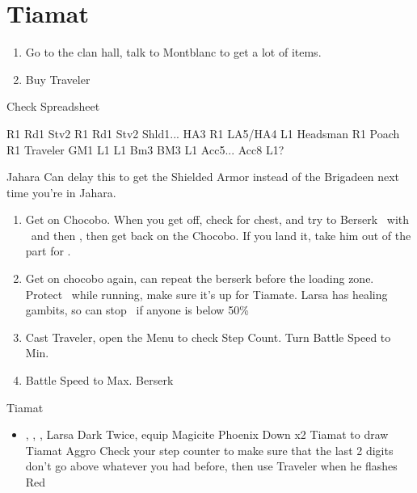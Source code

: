 \chapter{Tiamat}

\begin{enumerate}
\item Go to the clan hall, talk to Montblanc to get a lot of items.
\item Buy Traveler
\end{enumerate}
\begin{liscense}
Check Spreadsheet

			R1	Rd1	
				Stv2	
				R1	Rd1
					Stv2
Shld1... HA3					R1
LA5/HA4					
L1					Headsman
R1	Poach				R1
	Traveler				
	GM1				
L1	L1				Bm3
				BM3	L1
			Acc5... Acc8	L1?	
			\end{liscense}

\begin{shop}{Jahara}
Can delay this to get the Shielded Armor instead of the Brigadeen next time you're in Jahara.
\end{shop}
\begin{enumerate}
\item Get on Chocobo. When you get off, check for chest, and try to Berserk \basch\ with \penelo\ and then \vaan, then get back on the Chocobo. If you land it, take him out of the part for \balthier.
\item Get on chocobo again, can repeat the berserk before the loading zone.
\vaanf Protect \vaan\ while running, make sure it's up for Tiamate. Larsa has healing gambits, so can stop \flee\ if anyone is below 50\%
\item Cast Traveler, open the Menu to check Step Count. Turn Battle Speed to Min.
\item Battle Speed to Max. Berserk \basch
\end{enumerate}
\begin{battle}{Tiamat}
\begin{itemize}
\item \vaan, \balthier, \basch, Larsa
\vaanf Dark Twice, equip Magicite
\vaanf Phoenix Down x2 Tiamat to draw Tiamat Aggro
\balthierf Check your step counter to make sure that the last 2 digits don't go above whatever you had before, then use Traveler when he flashes Red
\end{itemize}
\end{battle}